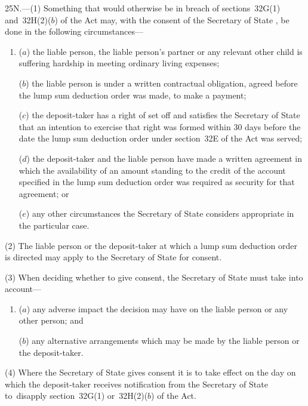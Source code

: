 \documentclass[12pt,a4paper]{article}
\begin{document}
25N.---(1)  Something that would otherwise be in breach of sections~32G(1) and~32H(2)($b$)  of the Act may, with the consent of the 
Secretary of State%
, be done in the following circumstances—
\begin{enumerate}\item[]
($a$) the liable person, the liable person’s partner or any relevant other child is suffering hardship in meeting ordinary living expenses;

($b$) the liable person is under a written contractual obligation, agreed before the lump sum deduction order was made, to make a payment;

($c$) the deposit-taker has a right of set off and satisfies the 
Secretary of State  %
that an intention to exercise that right was formed within 30 days before the date the lump sum deduction order under section~32E of the Act was served;

($d$) the deposit-taker and the liable person have made a written agreement in which the availability of an amount standing to the credit of the account specified in the lump sum deduction order was required as security for that agreement; or

($e$) any other circumstances the 
Secretary of State  %
considers appropriate in the particular case.
\end{enumerate}

(2) The liable person or the deposit-taker at which a lump sum deduction order is directed may apply to the 
Secretary of State  %
for consent.

(3) When deciding whether to give consent, the 
Secretary of State  %
must take into account—
\begin{enumerate}\item[]
($a$) any adverse impact the decision may have on the liable person or any other person; and

($b$) any alternative arrangements which may be made by the liable person or the deposit-taker.
\end{enumerate}

(4) Where the 
Secretary of State  %
gives consent it is to take effect on the day on which the deposit-taker receives notification from the 
Secretary of State  %
to~disapply section~32G(1) or~32H(2)($b$)  of the Act.
\end{document}
